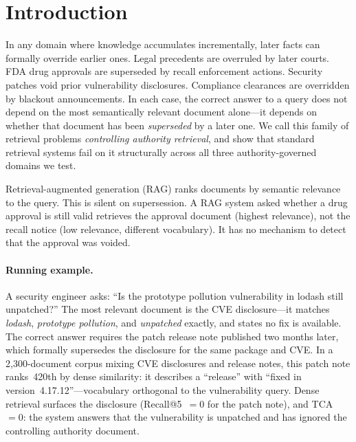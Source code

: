 \documentclass[11pt]{article}
\begin{document}
\section{Introduction}
\label{sec:intro}

In any domain where knowledge accumulates incrementally, later facts can formally override earlier ones. Legal precedents are overruled by later courts. FDA drug approvals are superseded by recall enforcement actions. Security patches void prior vulnerability disclosures. Compliance clearances are overridden by blackout announcements. In each case, the correct answer to a query does not depend on the most semantically relevant document alone---it depends on whether that document has been \emph{superseded} by a later one. We call this family of retrieval problems \emph{controlling authority retrieval}, and show that standard retrieval systems fail on it structurally across all three authority-governed domains we test.

Retrieval-augmented generation (RAG) \cite{lewis2020rag} ranks documents by semantic relevance to the query. This is silent on supersession. A RAG system asked whether a drug approval is still valid retrieves the approval document (highest relevance), not the recall notice (low relevance, different vocabulary). It has no mechanism to detect that the approval was voided.

\paragraph{Running example.} A security engineer asks: ``Is the prototype pollution vulnerability in lodash still unpatched?'' The most relevant document is the CVE disclosure---it matches \emph{lodash}, \emph{prototype pollution}, and \emph{unpatched} exactly, and states no fix is available. The correct answer requires the patch release note published two months later, which formally supersedes the disclosure for the same package and CVE. In a 2,300-document corpus mixing CVE disclosures and release notes, this patch note ranks~420th by dense similarity: it describes a ``release'' with ``fixed in version~4.17.12''---vocabulary orthogonal to the vulnerability query. Dense retrieval surfaces the disclosure (Recall@5~$= 0$ for the patch note), and TCA~$= 0$: the system answers that the vulnerability is unpatched and has ignored the controlling authority document.
\end{document}
